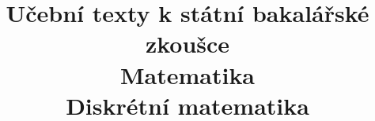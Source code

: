 \clearpage

\clearpage

\title{\LARGE Učební texty k státní bakalářské zkoušce \\ Matematika \\ Diskrétní matematika}



\maketitle

\newpage
\setcounter{section}{15}



